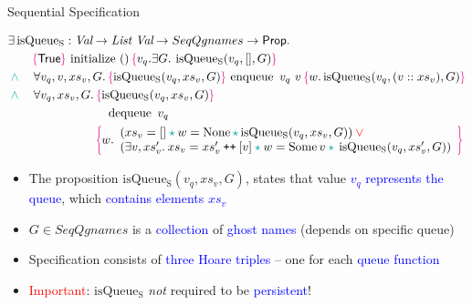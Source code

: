 \documentclass[9pt,xcolor={dvipsnames}]{beamer}
\newcommand{\initialise}{\operatorname{initialize}}
\newcommand{\enqueue}{\operatorname{enqueue}}
\newcommand{\dequeue}{\operatorname{dequeue}}
\newcommand{\isqueueseq}{\operatorname{isQueue_{S}}}
\newcommand{\SeqQgnames}{SeqQgnames}
\newcommand{\vq}{v_q}
\newcommand{\nodeval}{\valB}
\newcommand{\absvalue}{\val}
\newcommand{\absvalueList}{xs_v}
\newcommand{\Qg}{G}
\newcommand\catenate{\mathbin{\text{\ttfamily\upshape ++}}}
\newcommand{\seqspecinitHTGen}[2]{\hoare{\TRUE}{\initialise \ \TT}{#1 . \Exists #2. \isqueueseq(#1, [], #2)}}
\newcommand{\seqspecinitGen}[2]{\seqspecinitHTGen{#1}{#2}}
\newcommand{\seqspecinit}{\seqspecinitGen{\vq}{\Qg}}
\newcommand{\seqspecenqHT}[4]{\hoare{\isqueueseq(#1, #3, #4)}{\enqueue \ #1 \ #2}{\valB . \isqueueseq(#1, (#2 :: #3), #4)}}
\newcommand{\seqspecenqGen}[4]{\All #1, #2, #3, #4. \seqspecenqHT{#1}{#2}{#3}{#4}}
\newcommand{\seqspecenq}{\seqspecenqGen{\vq}{\absvalue}{\absvalueList}{\Qg}}
\newcommand{\seqspecdeqHT}[3]{\hoareV[t]{\isqueueseq(#1, #2, #3)}{\dequeue \ #1}{\nodeval . \begin{array}{l}(#2 = [] \star{} \nodeval = \None \star{} \isqueueseq(#1, #2, #3)) \lor{}\\ (\Exists \absvalue, #2' . #2 = #2' \catenate [\absvalue] \star{} \nodeval = \Some \absvalue \star{} \isqueueseq(#1, #2', #3)) \end{array}}}
\newcommand{\seqspecdeqGen}[3]{\All #1, #2, #3. \seqspecdeqHT{#1}{#2}{#3}}
\newcommand{\seqspecdeq}{\seqspecdeqGen{\vq}{\absvalueList}{\Qg}}
\let\oldlor\lor
\renewcommand{\lor}{\begingroup \color{red} \oldlor \endgroup}
\let\oldland\land
\renewcommand{\land}{\begingroup \color{Emerald} \oldland \endgroup}
\let\oldstar\star
\renewcommand{\star}{\begingroup \color{Emerald} \oldstar \endgroup}
\begin{document}
\begin{frame}{Sequential Specification}
  \begin{definition}\label{QueueSpecs:spec:seq}
    \setlength\abovedisplayskip{-8pt}
    \setlength\belowdisplayskip{2pt}
    \begin{align*}
      &\Exists \isqueueseq : \Val \to \List ~ \Val \to \SeqQgnames \to \Prop.\\
      &\quad\quad\seqspecinit\\
      &\land{}\quad\seqspecenq\\
      &\land{}\quad\seqspecdeq
    \end{align*}
  \end{definition}
  \begin{itemize}
    \item The proposition \textcolor{RubineRed}{$\isqueueseq(\vq, \absvalueList, \Qg)$}, states that value \textcolor{blue}{$\vq$ represents the queue}, which \textcolor{blue}{contains elements $\absvalueList$}
    \item $G \in \SeqQgnames{}$ is a \textcolor{blue}{collection} of \textcolor{blue}{ghost names} (depends on specific queue)
    \item Specification consists of \textcolor{blue}{three Hoare triples} -- one for each \textcolor{blue}{queue function}
    \item \textcolor{red}{Important}: $\isqueueseq$ \textit{not} required to be \textcolor{blue}{persistent}!
  \end{itemize}
\end{frame}
\end{document}
